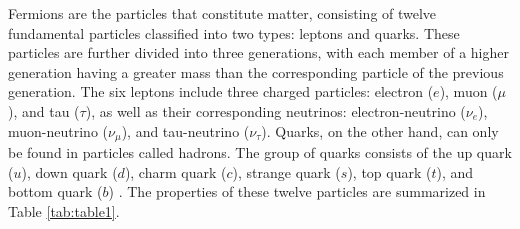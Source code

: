 Fermions are the particles that constitute matter, consisting of twelve fundamental particles classified into two types: leptons and quarks. These particles are further divided into three generations, with each member of a higher generation having a greater mass than the corresponding particle of the previous generation. The six leptons include three charged particles: electron ($e$), muon ($\mu$), and tau ($\tau$), as well as their corresponding neutrinos: electron-neutrino ($\nu_{e}$), muon-neutrino ($\nu_{\mu}$), and tau-neutrino ($\nu_{\tau}$). Quarks, on the other hand, can only be found in particles called hadrons. The group of quarks consists of the up quark ($u$), down quark ($d$), charm quark ($c$), strange quark ($s$), top quark ($t$), and bottom quark ($b$) \cite{griff,thomson_2013}. The properties of these twelve particles are summarized in Table \ref{tab:table1}.

